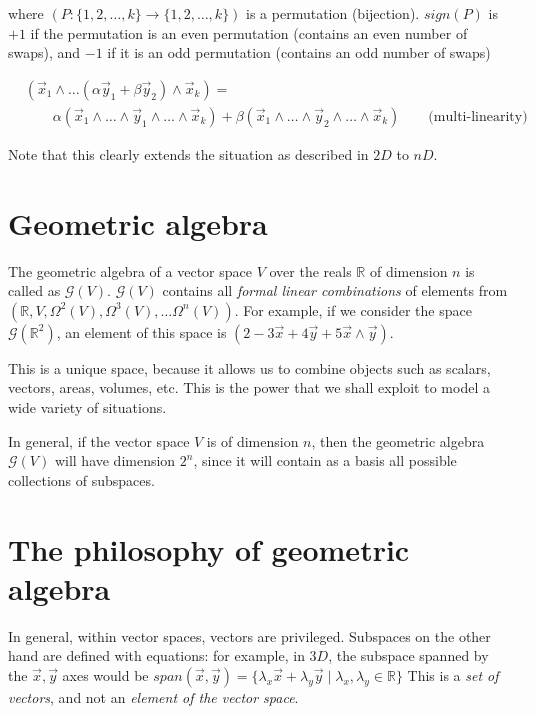 \documentclass[11pt]{book}
\newcommand{\R}{\ensuremath{\mathbb R}}
\newcommand{\G}{\ensuremath{\mathcal{G}}}
\begin{document}
where $(P: \{1, 2, \dots, k\} \rightarrow \{1, 2, \dots, k \})$ is a
permutation (bijection). $sign(P)$ is $+1$ if the permutation is an
even permutation (contains an even number of swaps), and $-1$ if it
is an odd permutation (contains an odd number of swaps) 

\begin{align*}
    &(\vec x_1 \wedge \dots (\alpha \vec y_1 + \beta \vec y_2) \wedge \vec x_k) = \\
    &\qquad \alpha (\vec x_1 \wedge \dots \wedge \vec y_1 \wedge \dots \wedge \vec x_k) +
    \beta (\vec x_1 \wedge \dots \wedge  \vec y_2 \wedge \dots \wedge \vec x_k)
    \qquad \text{(multi-linearity)}
\end{align*}

Note that this clearly extends the situation as described in $2D$ to $nD$.


\section{Geometric algebra}

The geometric algebra of a vector space $V$ over the reals $\R$ of dimension $n$
is called as $\G(V)$. $\G(V)$ contains
all \emph{formal linear combinations} of elements from
$\left( \R, V, \Omega^2(V), \Omega^3(V), \dots \Omega^n(V) \right)$.
For example, if we consider the space $\G(\R^2)$, an element of this space 
is  $(2 -3 \vec x + 4 \vec y + 5 \vec x \wedge \vec y)$. 

This is a unique space, because it allows us to combine objects such as 
scalars, vectors, areas, volumes, etc. This is the power that we shall exploit
to model a wide variety of situations.

In general, if the vector space $V$ is of dimension $n$, then the geometric
algebra $\G(V)$ will have dimension $2^n$, since it will contain as a basis
all possible collections of subspaces.


\section{The philosophy of geometric algebra}
In general, within vector spaces, vectors are privileged. Subspaces on the
other hand are defined with equations: for example, in $3D$, the subspace
spanned by the $\vec x, \vec y$ axes would be
$span(\vec x, \vec y) =
\{ \lambda_x \vec x  + \lambda_y \vec y \mid \lambda_x, \lambda_y \in \R \}$
This is a \emph{set of vectors}, and not an \emph{element of the vector space}.
\end{document}
